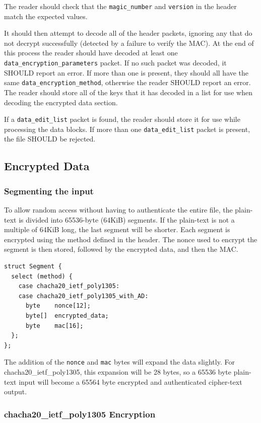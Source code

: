 \documentclass[10pt]{article}
\newcommand{\kw}[1]{\texttt{#1}}
\begin{document}
The reader should check that the \kw{magic\_number} and \kw{version} in the header match the expected values.

It should then attempt to decode all of the header packets, ignoring any that do not decrypt successfully
(detected by a failure to verify the MAC).
At the end of this process the reader should have decoded at least one \kw{data\_encryption\_parameters} packet.
If no such packet was decoded, it SHOULD report an error.
If more than one is present, they should all have the same \kw{data\_encryption\_method}, otherwise the reader
SHOULD report an error.
The reader should store all of the keys that it has decoded in a list for use when decoding the encrypted data section.

If a \kw{data\_edit\_list} packet is found, the reader should store it for use while processing the data blocks.
If more than one \kw{data\_edit\_list} packet is present, the file SHOULD be rejected.

\subsection{Encrypted Data}\label{data:encryption}

\subsubsection{Segmenting the input}

To allow random access without having to authenticate the entire file, the plain-text is divided into 65536-byte
(64KiB) segments.
If the plain-text is not a multiple of 64KiB long, the last segment will be shorter.
Each segment is encrypted using the method defined in the header.
The nonce used to encrypt the segment is then stored, followed by the encrypted data, and then the MAC.

\begin{verbatim}
struct Segment {
  select (method) {
    case chacha20_ietf_poly1305:
    case chacha20_ietf_poly1305_with_AD:
      byte    nonce[12];
      byte[]  encrypted_data;
      byte    mac[16];
  };
};
\end{verbatim}

The addition of the \kw{nonce} and \kw{mac} bytes will expand the data slightly.
For chacha20\_ietf\_poly1305, this expansion will be 28 bytes, so a 65536 byte plain-text input will become a 65564
byte encrypted and authenticated cipher-text output.

\subsubsection{chacha20\_ietf\_poly1305 Encryption}\label{data:chacha20_encryption}
\end{document}

